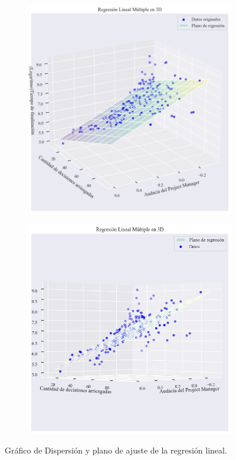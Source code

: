 \documentclass[a4paper, 12pt]{article}
\begin{document}
	\begin{figure}[htb!]
	\centering
	\begin{subfigure}{.45\linewidth}
		\includegraphics[height=.95\linewidth, width=.95\linewidth]{assets/multireg1}
		\caption{}
		\label{fig:7a}
	\end{subfigure}
	\begin{subfigure}{.45\linewidth}
		\includegraphics[height=.95\linewidth, width=.95\linewidth]{assets/multireg2}
		\caption{}
		\label{fig:7b}
	\end{subfigure}
	\caption{Gráfico de Dispersión y plano de ajuste de la regresión lineal.}
	\label{fig:7}
\end{figure}
\end{document}
